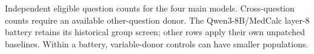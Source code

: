 \begin{table}[t]
\centering
\caption{Independent eligible question counts for the four main models.
Cross-question counts require an available other-question donor.
The Qwen3-8B/MedCalc layer-$8$ battery retains its historical group screen;
other rows apply their own unpatched baselines. Within a battery,
variable-donor controls can have smaller populations.}
\label{tab:extension-populations}
\small
\renewcommand{\arraystretch}{1.12}
\setlength{\tabcolsep}{3pt}

\end{table}
